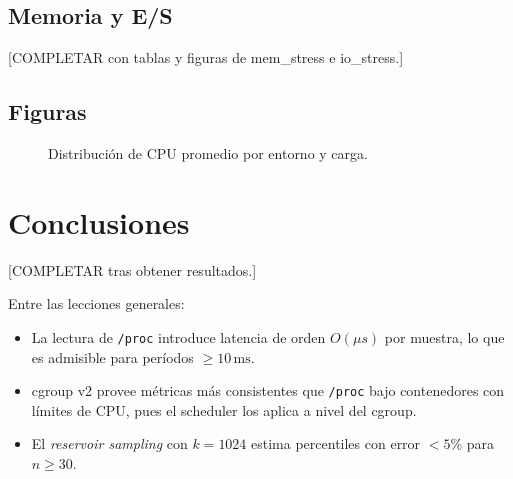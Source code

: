 \documentclass[conference]{IEEEtran}
\begin{document}
\subsection{Memoria y E/S}

[COMPLETAR con tablas y figuras de mem\_stress e io\_stress.]

\subsection{Figuras}

\begin{figure}[h]
  \centering
  \caption{Distribución de CPU promedio por entorno y carga.}
  \label{fig:boxplot_cpu}
\end{figure}

\section{Conclusiones}

[COMPLETAR tras obtener resultados.]

Entre las lecciones generales:
\begin{itemize}
  \item La lectura de \texttt{/proc} introduce latencia de orden $O(\mu s)$ por
    muestra, lo que es admisible para períodos $\geq 10\,\mathrm{ms}$.
  \item cgroup v2 provee métricas más consistentes que \texttt{/proc} bajo
    contenedores con límites de CPU, pues el scheduler los aplica a nivel del
    cgroup.
  \item El \textit{reservoir sampling} con $k=1024$ estima percentiles con
    error $< 5\%$ para $n \geq 30$.
\end{itemize}
\end{document}
